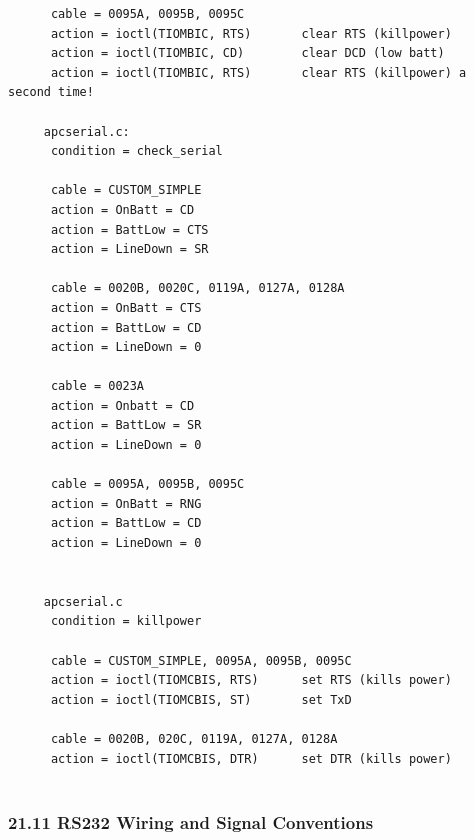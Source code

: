 {{{{{{{{{{\begin{verbatim}
      cable = 0095A, 0095B, 0095C
      action = ioctl(TIOMBIC, RTS)       clear RTS (killpower)
      action = ioctl(TIOMBIC, CD)        clear DCD (low batt)
      action = ioctl(TIOMBIC, RTS)       clear RTS (killpower) a second time!
     
     apcserial.c:
      condition = check_serial
     
      cable = CUSTOM_SIMPLE
      action = OnBatt = CD
      action = BattLow = CTS
      action = LineDown = SR
     
      cable = 0020B, 0020C, 0119A, 0127A, 0128A
      action = OnBatt = CTS
      action = BattLow = CD
      action = LineDown = 0
     
      cable = 0023A
      action = Onbatt = CD
      action = BattLow = SR
      action = LineDown = 0
     
      cable = 0095A, 0095B, 0095C
      action = OnBatt = RNG
      action = BattLow = CD
      action = LineDown = 0
     
     
     apcserial.c
      condition = killpower
     
      cable = CUSTOM_SIMPLE, 0095A, 0095B, 0095C
      action = ioctl(TIOMCBIS, RTS)      set RTS (kills power)
      action = ioctl(TIOMCBIS, ST)       set TxD
     
      cable = 0020B, 020C, 0119A, 0127A, 0128A
      action = ioctl(TIOMCBIS, DTR)      set DTR (kills power)
     
\end{verbatim}
\normalsize

\label{RS232-Wiring-and-Signal-Conventions}

\subsubsection*{21.11 RS232 Wiring and Signal Conventions}

\label{index-Cables-216}

}}}}}}}}}}

